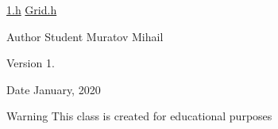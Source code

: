 
\begin{DoxyItemize}
\item \mbox{\hyperlink{1_8h_source}{1.\+h}} \mbox{\hyperlink{_grid_8h_source}{Grid.\+h}} \begin{DoxyAuthor}{Author}
Student Muratov Mihail 
\end{DoxyAuthor}
\begin{DoxyVersion}{Version}
1. 
\end{DoxyVersion}
\begin{DoxyDate}{Date}
January, 2020 
\end{DoxyDate}
\begin{DoxyWarning}{Warning}
This class is created for educational purposes 
\end{DoxyWarning}

\end{DoxyItemize}